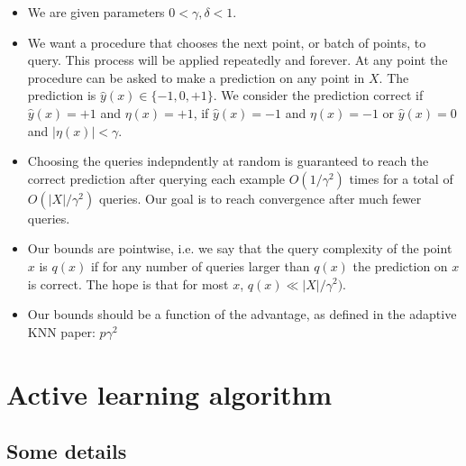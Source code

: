 \documentclass{article}
\def\yh{{\widehat{y}}}
\begin{document}
\begin{itemize}
\begin{itemize}
\item We are given parameters $0 < \gamma, \delta < 1$.
\item We want a procedure that chooses the next point, or batch of points, to query. This process will be applied repeatedly and forever. At any point the procedure can be asked to make a prediction on any point in $X$. The prediction is $\yh(x) \in \{-1,0,+1\}$. We consider the prediction correct if $\yh(x)=+1$ and $\eta(x)=+1$, if $\yh(x)=-1$ and $\eta(x)=-1$ or $\yh(x)=0$ and $|\eta(x)| < \gamma$. 
\item 
Choosing the queries indepndently at random is guaranteed to reach the correct prediction after querying each example $O(1/\gamma^2)$ times for a total of $O(|X|/\gamma^2)$ queries. Our goal is to reach convergence after much fewer queries.
\item 
Our bounds are pointwise, i.e. we say that the query complexity of the point $x$ is $q(x)$ if for any number of queries larger than $q(x)$ the prediction on $x$ is correct. The hope is that for most $x$, $q(x) \ll |X|/\gamma^2)$.
\item 
Our bounds should be a function of the advantage, as defined in the adaptive KNN paper: $p \gamma^2$

\end{itemize}

\end{itemize}

\section{Active learning algorithm}

\subsection{Some details}
\end{document}
